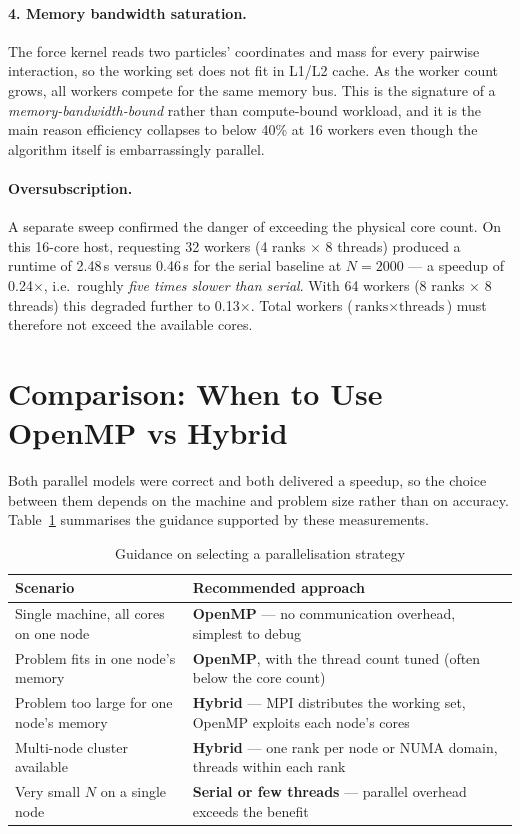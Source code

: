 \documentclass[11pt,a4paper]{article}
\begin{document}
\paragraph{4. Memory bandwidth saturation.}
The force kernel reads two particles' coordinates and mass for every pairwise
interaction, so the working set does not fit in L1/L2 cache. As the worker
count grows, all workers compete for the same memory bus. This is the
signature of a \emph{memory-bandwidth-bound} rather than compute-bound
workload, and it is the main reason efficiency collapses to below 40\% at 16
workers even though the algorithm itself is embarrassingly parallel.

\paragraph{Oversubscription.}
A separate sweep confirmed the danger of exceeding the physical core count.
On this 16-core host, requesting 32 workers (4 ranks $\times$ 8 threads)
produced a runtime of 2.48\,s versus 0.46\,s for the serial baseline at
$N=2000$ --- a speedup of 0.24$\times$, i.e.\ roughly \emph{five times slower
than serial}. With 64 workers (8 ranks $\times$ 8 threads) this degraded
further to 0.13$\times$. Total workers ($\text{ranks} \times \text{threads}$)
must therefore not exceed the available cores.

\section{Comparison: When to Use OpenMP vs Hybrid}

Both parallel models were correct and both delivered a speedup, so the choice
between them depends on the machine and problem size rather than on accuracy.
Table~\ref{tab:guidance} summarises the guidance supported by these
measurements.

\begin{table}[ht]
\centering
\caption{Guidance on selecting a parallelisation strategy}
\label{tab:guidance}
\begin{tabular}{p{7.5cm}p{6.5cm}}
\toprule
\textbf{Scenario} & \textbf{Recommended approach} \\
\midrule
Single machine, all cores on one node & \textbf{OpenMP} --- no communication
overhead, simplest to debug \\
Problem fits in one node's memory & \textbf{OpenMP}, with the thread count
tuned (often below the core count) \\
Problem too large for one node's memory & \textbf{Hybrid} --- MPI distributes
the working set, OpenMP exploits each node's cores \\
Multi-node cluster available & \textbf{Hybrid} --- one rank per node or NUMA
domain, threads within each rank \\
Very small $N$ on a single node & \textbf{Serial or few threads} --- parallel
overhead exceeds the benefit \\
\bottomrule
\end{tabular}
\end{table}
\end{document}
